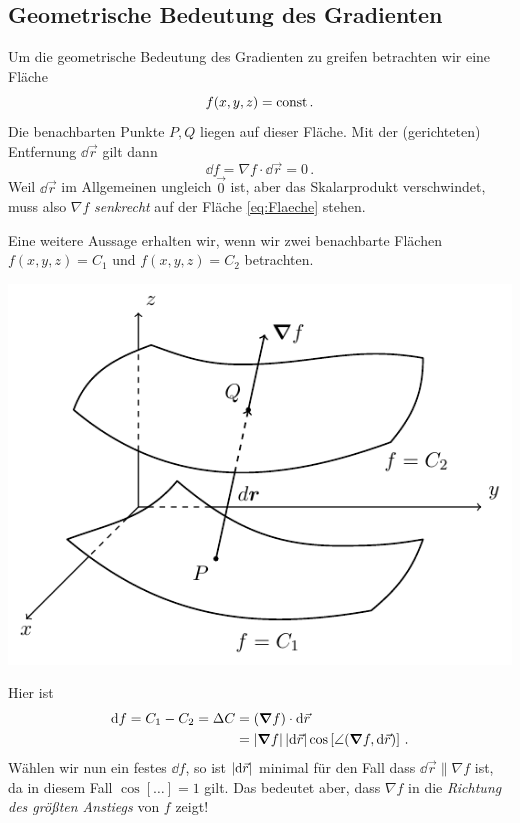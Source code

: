 \documentclass[paper=a4, fontsize=11.0pt, abstractoff, DIV12]{scrartcl}
\begin{document}
\subsection{Geometrische Bedeutung des Gradienten}

Um die geometrische Bedeutung des Gradienten zu greifen betrachten wir eine
Fläche
\begin{equation}
f(x,y,z) = \mathrm{const}\, .
\label{eq:Flaeche}
\end{equation}
Die benachbarten Punkte $P, Q$ liegen auf dieser Fläche. Mit der (gerichteten) Entfernung $\dd \vec r$ gilt dann
\begin{equation}
\dd f = \nabla f \cdot \dd \vec r = 0\,.
\end{equation}
Weil $\dd \vec r$ im Allgemeinen ungleich $\vec 0$ ist, aber das Skalarprodukt
verschwindet, muss also $\nabla f$ \emph{senkrecht} auf der Fläche
\eqref{eq:Flaeche} stehen.

Eine weitere Aussage erhalten wir, wenn wir zwei benachbarte Flächen
$f(x,y,z) = C_1$ und $f(x,y,z) = C_2$ betrachten.

\begin{center}
    \includegraphics{Figures/grad}
\end{center}
Hier ist
\begin{align}
\dd f = C_1 - C_2 = \Delta C &= (\nabla f)\cdot \dd \vec r\nonumber\\
&=\abs{\nabla f} \abs{\dd \vec r}\cos\left[\angle(\nabla f, \dd \vec r) \right]\,.
\end{align}
Wählen wir nun ein festes $\dd f$, so ist $\abs{\dd \vec r}$ minimal für den
Fall dass $\dd \vec r \parallel \nabla f$ ist, da in diesem Fall $\cos[\dots]=1$ gilt. Das bedeutet aber, dass $\nabla f$ in die \emph{Richtung des größten Anstiegs} von $f$ zeigt!
\end{document}
